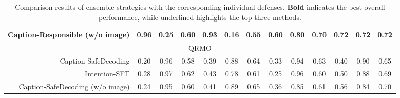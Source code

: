 \begin{table*}[!ht]
{\begin{tabular}{r|cccccc|cccccc}
        Caption-Responsible (w/o image) & 0.96 & 0.25 & 0.60 & 0.93 & 0.16 & 0.55 & 0.60 & 0.80 & \underline{0.70} & 0.72 & 0.72 & \textbf{0.72}\\
        \midrule
        \multicolumn{13}{c}{QR\textbar{}MO} \\
        \midrule
        Caption-SafeDecoding & 0.20 & 0.96 & 0.58 & 0.39 & 0.88 & 0.64 & 0.33 & 0.94 & 0.63 & 0.40 & 0.90 & 0.65 \\
        Intention-SFT & 0.28 & 0.97 & 0.62 & 0.43 & 0.78 & 0.61 & 0.25 & 0.96 & 0.60 & 0.50 & 0.88 & 0.69\\
        Caption-SafeDecoding (w/o image) & 0.24 & 0.95 & 0.60 & 0.41 & 0.89 & 0.65 & 0.36 & 0.85 & 0.61 & 0.56 & 0.84 & 0.70\\
        \bottomrule
    \end{tabular}}
    \caption{Comparison results of ensemble strategies with the corresponding individual defenses. \textbf{Bold} indicates the best overall performance, while \underline{underlined} highlights the top three methods.} %
    \label{tab:en_inter_results}
\end{table*}
